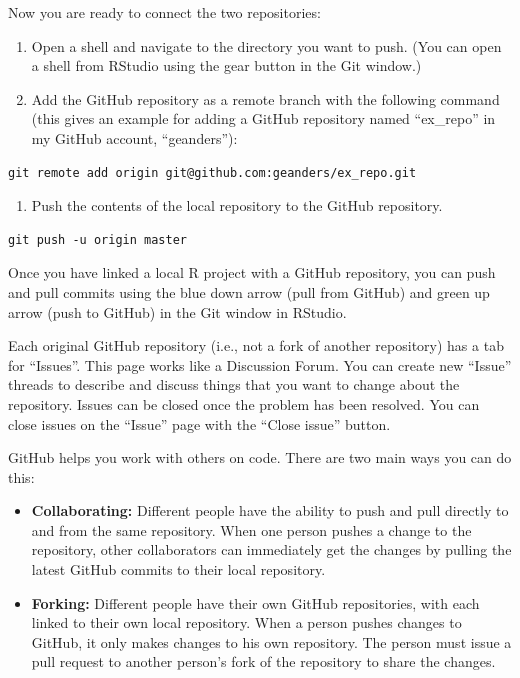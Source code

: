 \documentclass[]{tufte-book}
\providecommand{\tightlist}{%
  \setlength{\itemsep}{0pt}\setlength{\parskip}{0pt}}
\begin{document}
Now you are ready to connect the two repositories:

\begin{enumerate}
\def\labelenumi{\arabic{enumi}.}
\tightlist
\item
  Open a shell and navigate
  to the directory you want to push. (You can open a shell from RStudio using the
  gear button in the Git window.)
\item
  Add the GitHub repository as a remote branch
  with the following command (this gives an example for adding a GitHub repository
  named ``ex\_repo'' in my GitHub account, ``geanders''):
\end{enumerate}

\begin{verbatim}
git remote add origin git@github.com:geanders/ex_repo.git
\end{verbatim}

\begin{enumerate}
\def\labelenumi{\arabic{enumi}.}
\setcounter{enumi}{2}
\tightlist
\item
  Push the contents of the local repository to the GitHub repository.
\end{enumerate}

\begin{verbatim}
git push -u origin master
\end{verbatim}

Once you have linked a local R project with a GitHub repository, you can push
and pull commits using the blue down arrow (pull from GitHub) and green up arrow
(push to GitHub) in the Git window in RStudio.

Each original GitHub repository (i.e., not a fork of another repository) has a
tab for ``Issues''. This page works like a Discussion Forum. You can create new
``Issue'' threads to describe and discuss things that you want to change about the
repository. Issues can be closed once the problem has been resolved. You can
close issues on the ``Issue'' page with the ``Close issue'' button.

GitHub helps you work with others on code. There are two main ways you can do this:

\begin{itemize}
\tightlist
\item
  \textbf{Collaborating:} Different people have the ability to push and pull directly
  to and from the same repository. When one person pushes a change to the
  repository, other collaborators can immediately get the changes by pulling the
  latest GitHub commits to their local repository.
\item
  \textbf{Forking:} Different people have their own GitHub repositories, with each
  linked to their own local repository. When a person pushes changes to GitHub, it
  only makes changes to his own repository. The person must issue a pull request
  to another person's fork of the repository to share the changes.
\end{itemize}
\end{document}
